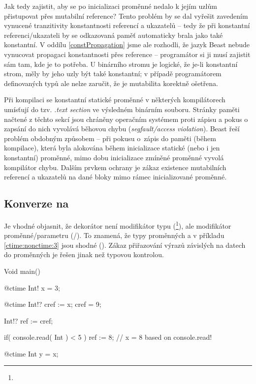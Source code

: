 Jak tedy zajistit, aby se po inicializaci proměnné  nedalo k jejím uzlům přistupovat přes mutabilní reference? Tento problém by se dal vyřešit zavedením vynucené tranzitivity konstantnosti referencí a ukazatelů -- tedy že při konstantní referenci/ukazateli by se odkazovaná paměť automaticky brala jako také konstantní. V oddílu \ref{constPropagation} jsme ale rozhodli, že jazyk Beast nebude vynucovat propagaci konstantnosti přes reference -- programátor si ji musí zajistit sám tam, kde je to potřeba. U binárního stromu je logické, že je-li konstantní strom, měly by jeho uzly být také konstantní; v případě programátorem definovaných typů ale nelze zaručit, že je mutabilita korektně ošetřena.

Při kompilaci se konstantní statické proměnné v některých kompilátorech umísťují do tzv. \textit{.text section} ve výsledném binárním souboru. Stránky paměti načtené z těchto sekcí jsou chráněny operačním systémem proti zápisu a pokus o zapsání do nich vyvolává běhovou chybu (\textit{segfault/access violation}). Beast řeší problém obdobným způsobem -- při pokusu o~zápis do paměti (během kompilace), která byla alokována během inicializace statické \ctime (nebo i jen konstantní) proměnné, mimo dobu inicializace zmíněné proměnné vyvolá kompilátor chybu. Dalším prvkem ochrany je zákaz existence mutabilních referencí a ukazatelů na dané bloky mimo rámec inicializované proměnné.

\subsection{Konverze na \nonctime}
Je vhodné objasnit, že dekorátor  není modifikátor typu (\footnote{}), ale modifikátor proměnné/parametru (/). To znamená, že typy proměnných  a  v příkladu \ref{ctime:nonctime:3} jsou shodné (). Zákaz přiřazování výrazů závislých na \nonctime datech do \ctime proměnných je řešen jinak než typovou kontrolou.

\begin{code}[\label{ctime:nonctime:3}]
Void main() {
	@ctime Int! x = 3;
	
	@ctime Int!? cref := x;
	cref = 9; $\label{ctime:nonctime:1}$
	
	Int!? ref := cref; $\label{ctime:nonctime:2}$
	
	if( console.read( Int ) < 5 )
		ref := 8; // x = 8 based on console.read!
		
	@ctime Int y = x;
}
\end{code}

